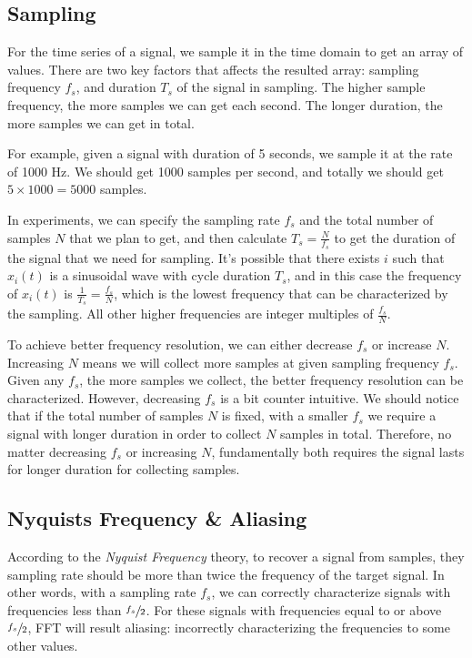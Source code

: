 \documentclass[11pt, oneside]{article}   	%
\begin{document}
\subsection{Sampling}
For the time series of a signal, we sample it in the time domain to get an array of values. There are two key factors that affects the resulted array: sampling frequency $f_s$, and duration $T_s$ of the signal in sampling. The higher sample frequency, the more samples we can get each second. The longer duration, the more samples we can get in total.

For example, given a signal with duration of 5 seconds, we sample it at the rate of 1000 Hz. We should get 1000 samples per second, and totally we should get $5\times 1000 = 5000$ samples.

In experiments, we can specify the sampling rate $f_s$ and the total number of samples $N$ that we plan to get, and then calculate $T_s = \frac{N}{f_s}$ to get the duration of the signal that we need for sampling. It's possible that there exists $i$ such that $x_i(t)$ is a sinusoidal wave with cycle duration $T_s$, and in this case the frequency of $x_i(t)$ is $\frac{1}{T_s} = \frac{f_s}{N}$, which is the lowest frequency that can be characterized by the sampling. All other higher frequencies are integer multiples of $\frac{f_s}{N}.$

To achieve better frequency resolution, we can either decrease $f_s$ or increase $N$. Increasing $N$ means we will collect more samples at given sampling frequency $f_s$. Given any $f_s$, the more samples we collect, the better frequency resolution can be characterized. However, decreasing $f_s$ is a bit counter intuitive. We should notice that if the total number of samples $N$ is fixed, with a smaller $f_s$ we require a signal with longer duration in order to collect $N$ samples in total. Therefore, no matter decreasing $f_s$ or  increasing $N$, fundamentally both requires the signal lasts for longer duration for collecting samples.

\subsection{Nyquists Frequency \& Aliasing}
According to the \emph{Nyquist Frequency} theory, to recover a signal from samples, they sampling rate should be more than twice the frequency of the target signal. In other words, with a sampling rate $f_s$, we can correctly characterize signals with frequencies less than $\sfrac{f_s}{2}$. For these signals with frequencies equal to or above $\sfrac{f_s}{2}$, FFT will result aliasing: incorrectly characterizing the frequencies to some other values.
\end{document}
